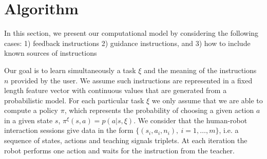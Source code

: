 \section{Algorithm}
\label{sec:Algorithm}

In this section, we present our computational model by considering the following cases: 1) feedback instructions 2) guidance instructions, and 3) how to include known sources of instructions

Our goal is to learn simultaneously a task $\xi$ and the meaning of the instructions $n$ provided by the user. We assume such instructions are represented in a fixed length feature vector with continuous values that are generated from a probabilistic model. For each particular task $\xi$ we only assume that we are able to compute a policy $\pi$, which represents the probability of choosing a given action $a$ in a given state $s$, $\pi^{\xi}(s,a)=p(a|s,\xi)$.
We consider that the human-robot interaction sessions give data in the form $\{(s_i,a_i,n_i),\ i = 1,\ldots,m\}$, i.e. a sequence of states, actions and teaching signals triplets. At each iteration the robot performs one action and waits for the instruction from the teacher.
%
%
%
